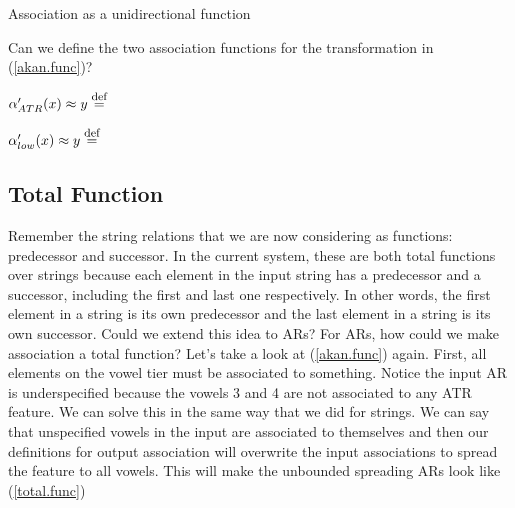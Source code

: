 \documentclass[,doc,floatsintext]{apa6}
\def\defeq{\mathrel{\buildrel \mbox{\footnotesize def} \over =}}
\theoremstyle{definition}
\theoremstyle{definition}
\theoremstyle{definition}
\theoremstyle{remark}
\begin{document}
\begin{exe}
\ex \label{akan.func} Association as a unidirectional function \\
\end{exe}

\noindent Can we define the two association functions for the
transformation in (\ref{akan.func})?

\noindent \(\alpha_{ATR}'(x)\approx y \defeq\) \vspace{0.25in}

\noindent \(\alpha_{low}'(x)\approx y \defeq\) \vspace{0.25in}

\subsection{Total Function}\label{total-function}

Remember the string relations that we are now considering as functions:
predecessor and successor. In the current system, these are both total
functions over strings because each element in the input string has a
predecessor and a successor, including the first and last one
respectively. In other words, the first element in a string is its own
predecessor and the last element in a string is its own successor. Could
we extend this idea to ARs? For ARs, how could we make association a
total function? Let's take a look at (\ref{akan.func}) again. First, all
elements on the vowel tier must be associated to something. Notice the
input AR is underspecified because the vowels 3 and 4 are not associated
to any ATR feature. We can solve this in the same way that we did for
strings. We can say that unspecified vowels in the input are associated
to themselves and then our definitions for output association will
overwrite the input associations to spread the feature to all vowels.
This will make the unbounded spreading ARs look like (\ref{total.func})
\end{document}
